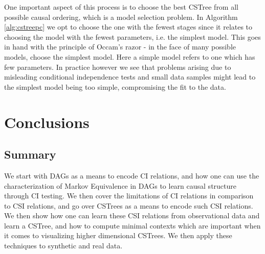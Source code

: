 \documentclass{tufte-book}
\begin{document}
One important aspect of this process is to choose the best CSTree from all possible causal ordering, which is a model selection problem. In Algorithm \ref{alg:cstreepc} we opt to choose the one with the fewest stages since it relates to choosing the model with the fewest parameters, i.e. the simplest model. This goes in hand with the principle of Occam's razor - in the face of many possible models, choose the simplest model. Here a simple model refers to one which has few parameters. In practice however we see that problems arising due to misleading conditional independence tests and small data samples might lead to the simplest model being too simple, compromising the fit to the data.



\chapter{Conclusions}
\label{sec:org0f5c10c}
\section{Summary}
\label{sec:org47d815f}
We start with DAGs as a means to encode CI relations, and how one can use the characterization of Markov Equivalence in DAGs to learn causal structure through CI testing. We then cover the limitations of CI relations in comparison to CSI relations, and go over CSTrees as a means to encode such CSI relations. We then show how one can learn these CSI relations from observational data and learn a CSTree, and how to compute minimal contexts which are important when it comes to visualizing higher dimensional CSTrees. We then apply these techniques to synthetic and real data.
\end{document}
